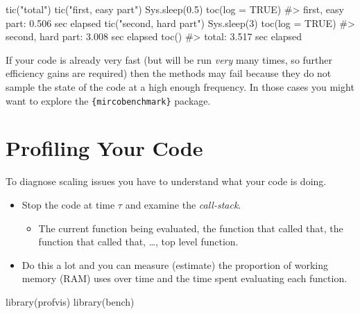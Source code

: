 \documentclass[
  letterpaper,
  DIV=11,
  numbers=noendperiod]{scrreprt}
\newenvironment{Shaded}{\begin{snugshade}}{\end{snugshade}}
\newcommand{\AttributeTok}[1]{\textcolor[rgb]{0.40,0.45,0.13}{#1}}
\newcommand{\CommentTok}[1]{\textcolor[rgb]{0.37,0.37,0.37}{#1}}
\newcommand{\ConstantTok}[1]{\textcolor[rgb]{0.56,0.35,0.01}{#1}}
\newcommand{\DecValTok}[1]{\textcolor[rgb]{0.68,0.00,0.00}{#1}}
\newcommand{\FloatTok}[1]{\textcolor[rgb]{0.68,0.00,0.00}{#1}}
\newcommand{\FunctionTok}[1]{\textcolor[rgb]{0.28,0.35,0.67}{#1}}
\newcommand{\NormalTok}[1]{\textcolor[rgb]{0.00,0.23,0.31}{#1}}
\newcommand{\StringTok}[1]{\textcolor[rgb]{0.13,0.47,0.30}{#1}}
\providecommand{\tightlist}{%
  \setlength{\itemsep}{0pt}\setlength{\parskip}{0pt}}\usepackage{longtable,booktabs,array}
\begin{document}
\begin{Shaded}
\begin{Highlighting}[]
\FunctionTok{tic}\NormalTok{(}\StringTok{"total"}\NormalTok{)}
\FunctionTok{tic}\NormalTok{(}\StringTok{"first, easy part"}\NormalTok{)}
\FunctionTok{Sys.sleep}\NormalTok{(}\FloatTok{0.5}\NormalTok{)}
\FunctionTok{toc}\NormalTok{(}\AttributeTok{log =} \ConstantTok{TRUE}\NormalTok{)}
\CommentTok{\#\textgreater{} first, easy part: 0.506 sec elapsed}
\FunctionTok{tic}\NormalTok{(}\StringTok{"second, hard part"}\NormalTok{)}
\FunctionTok{Sys.sleep}\NormalTok{(}\DecValTok{3}\NormalTok{)}
\FunctionTok{toc}\NormalTok{(}\AttributeTok{log =} \ConstantTok{TRUE}\NormalTok{)}
\CommentTok{\#\textgreater{} second, hard part: 3.008 sec elapsed}
\FunctionTok{toc}\NormalTok{()}
\CommentTok{\#\textgreater{} total: 3.517 sec elapsed}
\end{Highlighting}
\end{Shaded}

If your code is already very fast (but will be run \emph{very} many
times, so further efficiency gains are required) then the methods may
fail because they do not sample the state of the code at a high enough
frequency. In those cases you might want to explore the
\texttt{\{mircobenchmark\}} package.

\section{Profiling Your Code}\label{profiling-your-code}

To diagnose scaling issues you have to understand what your code is
doing.

\begin{itemize}
\item
  Stop the code at time \(\tau\) and examine the \emph{call-stack}.

  \begin{itemize}
  \tightlist
  \item
    The current function being evaluated, the function that called that,
    the function that called that, \ldots, top level function.
  \end{itemize}
\item
  Do this a lot and you can measure (estimate) the proportion of working
  memory (RAM) uses over time and the time spent evaluating each
  function.
\end{itemize}

\begin{Shaded}
\begin{Highlighting}[]
\FunctionTok{library}\NormalTok{(profvis)}
\FunctionTok{library}\NormalTok{(bench)}
\end{Highlighting}
\end{Shaded}
\end{document}
